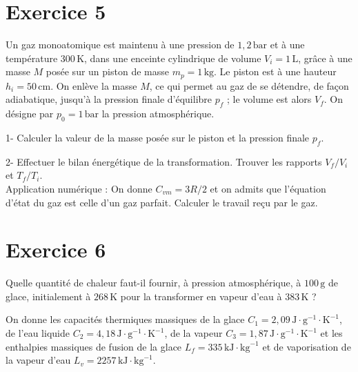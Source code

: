 \documentclass[a4paper,12pt]{article}
\begin{document}
	\section*{Exercice 5}
	Un gaz monoatomique est maintenu à une pression de $1{,}2\,\text{bar}$ et à une température $300\,\text{K}$, dans une enceinte cylindrique de volume $V_i = 1\,\text{L}$, grâce à une masse $M$ posée sur un piston de masse $m_p = 1\,\text{kg}$. Le piston est à une hauteur $h_i = 50\,\text{cm}$. On enlève la masse $M$, ce qui permet au gaz de se détendre, de façon adiabatique, jusqu'à la pression finale d'équilibre $p_f$ ; le volume est alors $V_f$. On désigne par $p_0 = 1\,\text{bar}$ la pression atmosphérique.
	
	1- Calculer la valeur de la masse posée sur le piston et la pression finale $p_f$.
	
	2- Effectuer le bilan énergétique de la transformation. Trouver les rapports $V_f/V_i$ et $T_f/T_i$. \\
	Application numérique : On donne $C_{vm} = 3R/2$ et on admits que l'équation d'état du gaz est celle d'un gaz parfait. Calculer le travail reçu par le gaz.
	
	\section*{Exercice 6}
	Quelle quantité de chaleur faut-il fournir, à pression atmosphérique, à $100\,\text{g}$ de glace, initialement à $268\,\text{K}$ pour la transformer en vapeur d'eau à $383\,\text{K}$ ?
	
	On donne les capacités thermiques massiques de la glace $C_1 = 2{,}09\,\text{J}\cdot\text{g}^{-1}\cdot\text{K}^{-1}$, de l'eau liquide $C_2 = 4{,}18\,\text{J}\cdot\text{g}^{-1}\cdot\text{K}^{-1}$, de la vapeur $C_3 = 1{,}87\,\text{J}\cdot\text{g}^{-1}\cdot\text{K}^{-1}$ et les enthalpies massiques de fusion de la glace $L_f = 335\,\text{kJ}\cdot\text{kg}^{-1}$ et de vaporisation de la vapeur d'eau $L_v = 2257\,\text{kJ}\cdot\text{kg}^{-1}$.
	
\end{document}
